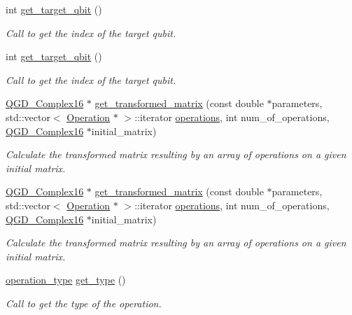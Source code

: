 \begin{DoxyCompactItemize}
int \hyperlink{class_operation_a55eee2ad4b90be085b1ec2ce018502f8}{get\+\_\+target\+\_\+qbit} ()
\begin{DoxyCompactList}\small\item\em Call to get the index of the target qubit. \end{DoxyCompactList}\item 
int \hyperlink{class_operation_a55eee2ad4b90be085b1ec2ce018502f8}{get\+\_\+target\+\_\+qbit} ()
\begin{DoxyCompactList}\small\item\em Call to get the index of the target qubit. \end{DoxyCompactList}\item 
\hyperlink{struct_q_g_d___complex16}{Q\+G\+D\+\_\+\+Complex16} $\ast$ \hyperlink{class_decomposition___base_a74159036ee14ac2c33a0ccd45de782d5}{get\+\_\+transformed\+\_\+matrix} (const double $\ast$parameters, std\+::vector$<$ \hyperlink{class_operation}{Operation} $\ast$ $>$\+::iterator \hyperlink{class_operation__block_a1efec4139888e591b59acd7b84497af1}{operations}, int num\+\_\+of\+\_\+operations, \hyperlink{struct_q_g_d___complex16}{Q\+G\+D\+\_\+\+Complex16} $\ast$initial\+\_\+matrix)
\begin{DoxyCompactList}\small\item\em Calculate the transformed matrix resulting by an array of operations on a given initial matrix. \end{DoxyCompactList}\item 
\hyperlink{struct_q_g_d___complex16}{Q\+G\+D\+\_\+\+Complex16} $\ast$ \hyperlink{class_decomposition___base_a8e26f5a31475e4d5a2e9c785a2a57dd9}{get\+\_\+transformed\+\_\+matrix} (const double $\ast$parameters, std\+::vector$<$ \hyperlink{class_operation}{Operation} $\ast$ $>$\+::iterator \hyperlink{class_operation__block_a1efec4139888e591b59acd7b84497af1}{operations}, int num\+\_\+of\+\_\+operations, \hyperlink{struct_q_g_d___complex16}{Q\+G\+D\+\_\+\+Complex16} $\ast$initial\+\_\+matrix)
\begin{DoxyCompactList}\small\item\em Calculate the transformed matrix resulting by an array of operations on a given initial matrix. \end{DoxyCompactList}\item 
\hyperlink{operations_2include_2_operation_8h_ad99e62941c8e4b13e5fc45ecaaf65eff}{operation\+\_\+type} \hyperlink{class_operation_acc601a7a00616fd6e2a61f61e084afac}{get\+\_\+type} ()
\begin{DoxyCompactList}\small\item\em Call to get the type of the operation. \end{DoxyCompactList}\item 

\end{DoxyCompactItemize}
